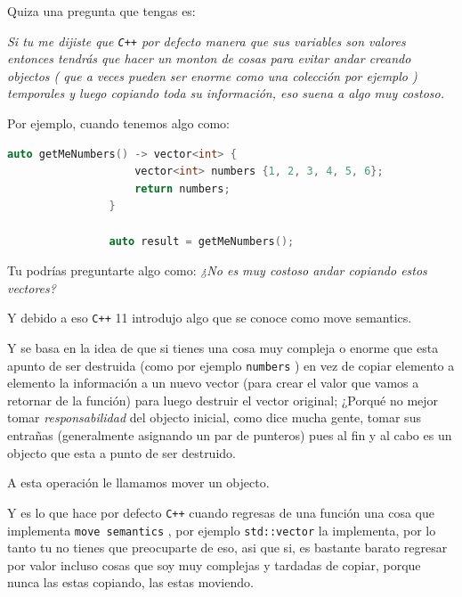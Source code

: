 \documentclass[12pt, fleqn]{report}                             %
\theoremstyle{break}                                            %
\newcommand{\textCode}[1]  { \texttt{#1} }                      %
\newcommand \Cpp  {\textCode{C++} }                               %
\begin{document}
            Quiza una pregunta que tengas es:

            \textit{
                Si tu me dijiste que \Cpp por defecto manera que sus variables son valores
                entonces tendrás que hacer un monton de cosas para evitar andar creando objectos (
                    que a veces pueden ser enorme como una colección por ejemplo
                ) temporales y luego copiando toda su información, eso suena a algo muy costoso.
            }

            Por ejemplo, cuando tenemos algo como:
            \begin{lstlisting}[language=C++, gobble=20]
                auto getMeNumbers() -> vector<int> {
                    vector<int> numbers {1, 2, 3, 4, 5, 6};
                    return numbers;
                }

                auto result = getMeNumbers();
            \end{lstlisting}

            Tu podrías preguntarte algo como:
            \textit{
                ¿No es muy costoso andar copiando estos vectores? 
            }

            Y debido a eso \Cpp 11 introdujo algo que se conoce como move semantics.

            Y se basa en la idea de que si tienes una cosa muy compleja o enorme
            que esta apunto de ser destruida (como por ejemplo \textCode{numbers})
            en vez de copiar elemento a elemento la información a un nuevo vector (para crear
            el valor que vamos a retornar de la función) 
            para luego destruir el vector original; ¿Porqué no mejor tomar \emph{responsabilidad}
            del objecto inicial, como dice mucha gente, tomar sus entrañas  
            (generalmente asignando un par de punteros) pues al fin y al cabo es un objecto que esta a punto
            de ser destruido. 

            A esta operación le llamamos mover un objecto.

            \cite{ModernCppWhatYouNeedToKnow}

            Y es lo que hace por defecto \Cpp cuando regresas de una función una cosa que implementa
            \textCode{move semantics}, por ejemplo \textCode{std::vector} la implementa, por lo tanto
            tu no tienes que preocuparte de eso, asi que si, es bastante barato regresar por valor
            incluso cosas que soy muy complejas y tardadas de copiar, porque nunca las estas copiando, 
            las estas moviendo.
\end{document}
